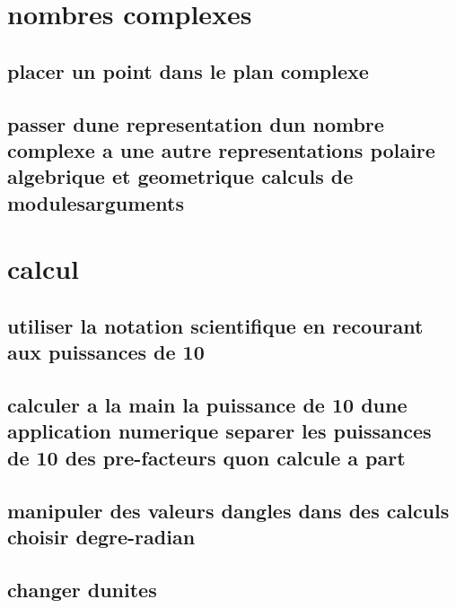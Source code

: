 \documentclass[11pt]{article}
\begin{document}
  \section{nombres complexes}
    \subsection{placer un point dans le plan complexe}
      
    \subsection{passer dune representation dun nombre complexe a une autre   representations polaire  algebrique et geometrique calculs de modulesarguments}
      
  \section{calcul}
    \subsection{utiliser la notation scientifique en recourant aux puissances de 10}
      
    \subsection{calculer a la main la puissance de 10 dune application numerique separer les puissances de 10 des pre-facteurs quon calcule a part}
      
    \subsection{manipuler des valeurs dangles dans des calculs choisir degre-radian}
      
    \subsection{changer dunites}
      
      
\end{document}
